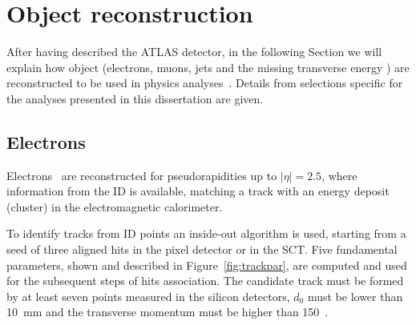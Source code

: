 
\section{Object reconstruction}\label{sec:objects}

After having described the ATLAS detector, in the following Section we will
explain how object (electrons, muons, jets and the missing transverse energy \met) 
are reconstructed to be used in physics analyses~\cite{Aad:2009wy}. Details from
selections specific for the analyses presented in this dissertation are given.


\subsection{Electrons}\label{sec:electrons}
Electrons~\cite{eperf} are reconstructed for pseudorapidities up to $|\eta| = 2.5$, where
information from the ID is available, matching a track with an energy deposit
(cluster) in the electromagnetic calorimeter. 

To identify tracks from ID points an inside-out algorithm is used, starting from a 
seed of three aligned hits in the pixel detector or in the SCT. Five fundamental parameters,
shown and described in Figure~\ref{fig:trackpar}, are computed and used for the subsequent 
steps of hits association. The candidate track must be formed by at least seven points
measured in the silicon detectors, $d_0$ must be lower than 10~mm and the 
transverse momentum must be higher than 150~\mev.

